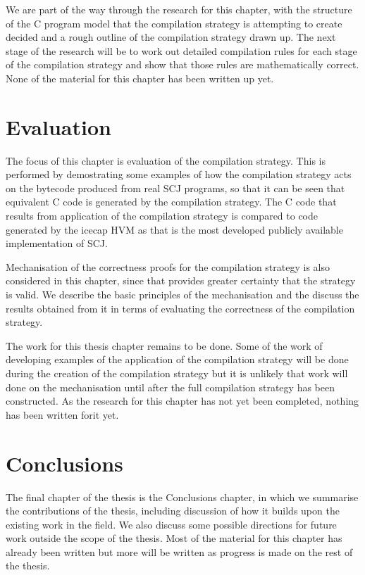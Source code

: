 \documentclass[a4paper,10pt]{report}
\begin{document}
We are part of the way through the research for this chapter, with the
structure of the C program model that the compilation strategy is
attempting to create decided and a rough outline of the compilation
strategy drawn up.
The next stage of the research will be to work out detailed
compilation rules for each stage of the compilation strategy and show
that those rules are mathematically correct.
None of the material for this chapter has been written up yet.

\section{Evaluation}

The focus of this chapter is evaluation of the compilation strategy.
This is performed by demostrating some examples of how the compilation
strategy acts on the bytecode produced from real SCJ programs, so that
it can be seen that equivalent C code is generated by the compilation
strategy.
The C code that results from application of the compilation strategy
is compared to code generated by the icecap HVM as that is the most
developed publicly available implementation of SCJ.

Mechanisation of the correctness proofs for the compilation strategy
is also considered in this chapter, since that provides greater
certainty that the strategy is valid.
We describe the basic principles of the mechanisation and the discuss
the results obtained from it in terms of evaluating the correctness of
the compilation strategy.

The work for this thesis chapter remains to be done.
Some of the work of developing examples of the application of the
compilation strategy will be done during the creation of the
compilation strategy but it is unlikely that work will done on the
mechanisation until after the full compilation strategy has been
constructed.
As the research for this chapter has not yet been completed, nothing
has been written forit yet.

\section{Conclusions}

The final chapter of the thesis is the Conclusions chapter, in which
we summarise the contributions of the thesis, including discussion of
how it builds upon the existing work in the field.
We also discuss some possible directions for future work outside the
scope of the thesis.
Most of the material for this chapter has already been written but
more will be written as progress is made on the rest of the thesis. 
\end{document}
